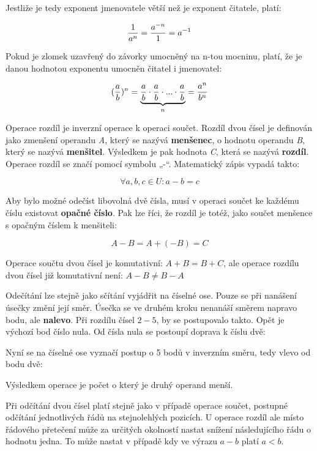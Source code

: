 Jestliže je tedy exponent jmenovatele větší než je exponent čitatele, platí:

$$ {1 \over a^n} = {a^{-n}\over 1} = a^{-1} $$

Pokud je zlomek uzavřený do závorky umocněný na n-tou mocninu, platí, že je danou hodnotou exponentu umocněn čitatel i jmenovatel:

$$ ({a\over b})^n = \underbrace {{a\over b} \cdot {a\over b} \cdot ... \cdot {a \over b}}_n = {a^n \over b^n} $$


Operace rozdíl je inverzní operace k operaci součet. Rozdíl dvou čísel je definován jako zmenšení operandu {\it A}, který se nazývá {\bf menšenec}, o hodnotu operandu {\it B}, který se nazývá {\bf menšitel}. Výsledkem je pak hodnota  {\it C}, která se nazývá {\bf rozdíl}. Operace rozdíl se značí pomocí symbolu „-“. Matematický zápis vypadá takto:

$$\forall a,b,c \in U: a - b = c $$

Aby bylo možné odečíst libovolná dvě čísla, musí v operaci součet ke každému číslu existovat {\bf opačné číslo}. Pak lze říci, že rozdíl je totéž, jako součet menšence s opačným číslem k menšiteli:

$$ A - B = A + (-B) = C$$

Operace součtu dvou čísel je komutativní: $A+B = B+C$, ale operace rozdílu dvou čísel již komutativní není: $A - B \not = B -A$


Odečítání lze stejně jako sčítání vyjádřit na číselné ose. Pouze se při nanášení úsečky změní její směr. Úsečka se ve druhém kroku nenanáší směrem napravo bodu, ale {\bf nalevo}. Při rozdílu čísel $2 - 5$, by se postupovalo takto. Opět je výchozí bod číslo nula. Od čísla nula se postoupí doprava k číslu dvě:

\vskip 4mm
\centerline{}
\vskip 4mm

Nyní se na číselné ose vyznačí postup o 5 bodů v inverzním směru, tedy vlevo od bodu dvě:

\vskip 4mm
\centerline{}
\vskip 4mm

Výsledkem operace je počet o který je druhý operand menší.


Při odčítání dvou čísel platí stejně jako v případě operace součet, postupné odčítání jednotlivých řádů na stejnolehlých pozicích. U operace rozdíl ale místo řádového přetečení může za určitých okolností nastat snížení následujícího řádu o hodnotu jedna. To může nastat v případě kdy ve výrazu $a - b$ platí $a<b$.

